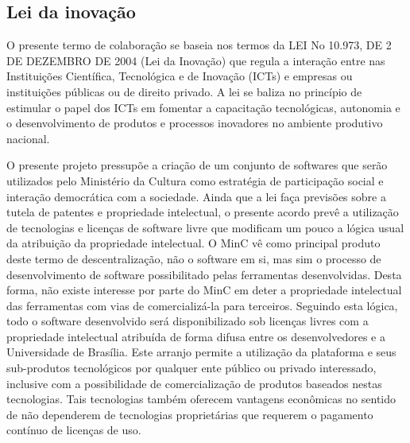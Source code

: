 \subsection{Lei da inovação}

O presente termo de colaboração se baseia nos termos da LEI No 10.973, DE 2 DE DEZEMBRO DE 2004 (Lei da Inovação) que regula a interação 
entre nas Instituições Científica, Tecnológica e de Inovação (ICTs) e empresas ou instituições públicas ou de direito privado. A lei se
baliza no princípio de estimular o papel dos ICTs em fomentar a capacitação tecnológicas, autonomia e o desenvolvimento de produtos e processos 
inovadores no ambiente produtivo nacional. 

O presente projeto pressupõe a criação de um conjunto de softwares que serão utilizados pelo Ministério da Cultura como estratégia 
de participação social e interação democrática com a sociedade. Ainda que a lei faça previsões sobre a tutela de patentes e
propriedade intelectual, o presente acordo prevê a utilização de tecnologias e licenças de software livre que modificam um pouco a lógica usual
da atribuição da propriedade intelectual. O MinC vê como principal produto deste termo de descentralização, não o software em si, mas sim o processo
de desenvolvimento de software possibilitado pelas ferramentas desenvolvidas.
Desta forma, não existe interesse por parte do MinC em deter a propriedade intelectual das 
ferramentas com vias de comercializá-la para terceiros. Seguindo esta lógica, todo o software desenvolvido será disponibilizado sob licenças livres
com a propriedade intelectual atribuída de forma difusa entre os desenvolvedores e a Universidade de Brasília. Este arranjo permite a utilização 
da plataforma e seus sub-produtos tecnológicos por qualquer ente público ou privado interessado, inclusive com a possibilidade de comercialização
de produtos baseados nestas tecnologias. Tais tecnologias também oferecem vantagens econômicas no sentido de não dependerem de tecnologias
proprietárias que requerem o pagamento contínuo de licenças de uso.

